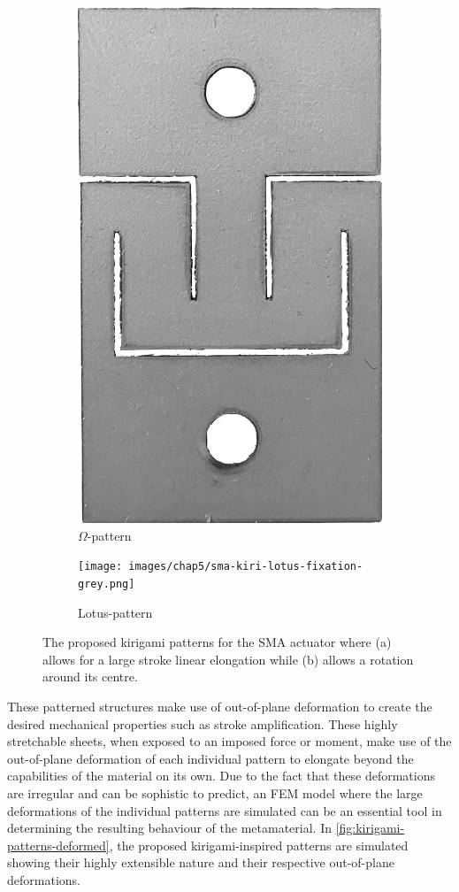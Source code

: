\begin{figure}[hbt]
     \centering
     \begin{subfigure}[b]{0.45\textwidth}
         \centering
         \includegraphics[height=0.66\textwidth,angle=180]{images/chap5/sma-kiri-unit-grey.png}
         \caption{$\Omega$-pattern}
         \label{fig:omega-pattern-simple}
     \end{subfigure}
     \begin{subfigure}[b]{0.45\textwidth}
         \centering
         \texttt{[image: images/chap5/sma-kiri-lotus-fixation-grey.png]}
         \caption{Lotus-pattern}
         \label{fig:lotus-pattern-simple}
     \end{subfigure}
    \caption{The proposed kirigami patterns for the SMA actuator where (a) allows for a large stroke linear elongation while (b) allows a rotation around its centre.}
    \label{fig:sma-kiri-patterns}
\end{figure}

These patterned structures make use of out-of-plane deformation to create the desired mechanical properties such as stroke amplification. These highly stretchable sheets, when exposed to an imposed force or moment, make use of the out-of-plane deformation of each individual pattern to elongate beyond the capabilities of the material on its own. Due to the fact that these deformations are irregular and can be sophistic to predict, an FEM model where the large deformations of the individual patterns are simulated can be an essential tool in determining the resulting behaviour of the metamaterial. In \cref{fig:kirigami-patterns-deformed}, the proposed kirigami-inspired patterns are simulated showing their highly extensible nature and their respective out-of-plane deformations.

